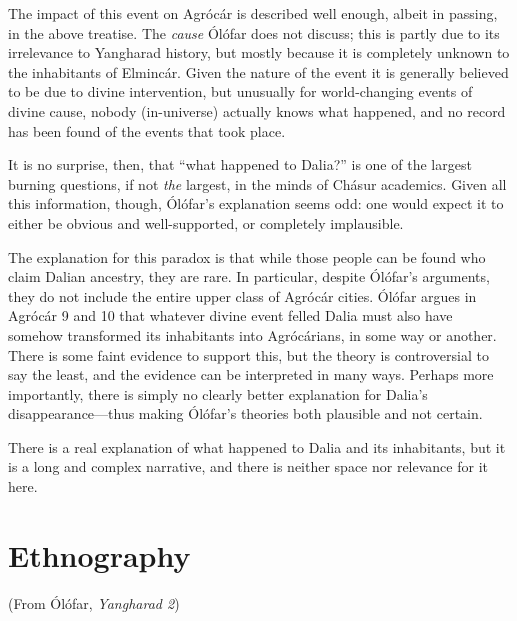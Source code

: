 \documentclass{article}
\begin{document}
The impact of this event on Agrócár is described well enough, albeit in passing, in the above treatise. The \emph{cause} Ólófar does not discuss; this is partly due to its irrelevance to Yangharad history, but mostly because it is completely unknown to the inhabitants of Elmincár. Given the nature of the event it is generally believed to be due to divine intervention, but unusually for world-changing events of divine cause, nobody (in-universe) actually knows what happened, and no record has been found of the events that took place.

It is no surprise, then, that ``what happened to Dalia?'' is one of the largest burning questions, if not \emph{the} largest, in the minds of Chásur academics. Given all this information, though, Ólófar's explanation seems odd: one would expect it to either be obvious and well-supported, or completely implausible.

The explanation for this paradox is that while those people can be found who claim Dalian ancestry, they are rare. In particular, despite Ólófar's arguments, they do not include the entire upper class of Agrócár cities. Ólófar argues in Agrócár 9 and 10 that whatever divine event felled Dalia must also have somehow transformed its inhabitants into Agrócárians, in some way or another. There is some faint evidence to support this, but the theory is controversial to say the least, and the evidence can be interpreted in many ways. Perhaps more importantly, there is simply no clearly better explanation for Dalia's disappearance—thus making Ólófar's theories both plausible and not certain.

There is a real explanation of what happened to Dalia and its inhabitants, but it is a long and complex narrative, and there is neither space nor relevance for it here.

\section*{Ethnography}

(From Ólófar, \textit{Yangharad 2})
\end{document}

